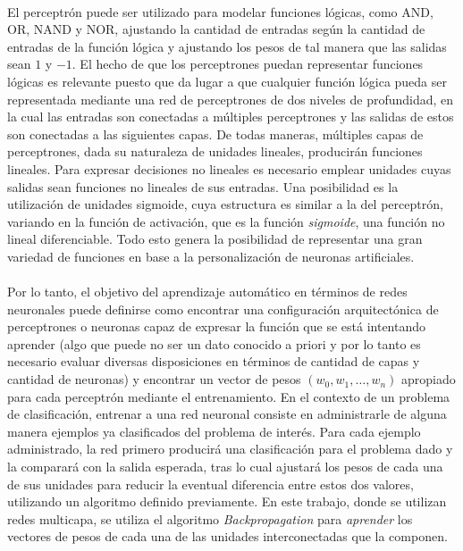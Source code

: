 \paragraph{}El perceptrón puede ser utilizado para modelar funciones lógicas, como AND, OR, NAND y NOR, ajustando la cantidad de entradas según la cantidad de entradas de la función lógica y ajustando los pesos de tal manera que las salidas sean $1$ y $-1$. El hecho de que los perceptrones puedan representar funciones lógicas es relevante puesto que da lugar a que cualquier función lógica pueda ser representada mediante una red de perceptrones de dos niveles de profundidad, en la cual las entradas son conectadas a múltiples perceptrones y las salidas de estos son conectadas a las siguientes capas. De todas maneras, múltiples capas de perceptrones, dada su naturaleza de unidades lineales, producirán funciones lineales. Para expresar decisiones no lineales es necesario emplear unidades cuyas salidas sean funciones no lineales de sus entradas. Una posibilidad es la utilización de unidades sigmoide, cuya estructura es similar a la del perceptrón, variando en la función de activación, que es la función \textit{sigmoide}, una función no lineal diferenciable. Todo esto genera la posibilidad de representar una gran variedad de funciones en base a la personalización de neuronas artificiales.

\paragraph{}Por lo tanto, el objetivo del aprendizaje automático en términos de redes neuronales puede definirse como encontrar una configuración arquitectónica de perceptrones o neuronas capaz de expresar la función que se está intentando aprender (algo que puede no ser un dato conocido a priori y por lo tanto es necesario evaluar diversas disposiciones en términos de cantidad de capas y cantidad de neuronas) y encontrar un vector de pesos $(w_0,w_1,\dots,w_n)$ apropiado para cada perceptrón mediante el entrenamiento. 
En el contexto de un problema de clasificación, entrenar a una red neuronal consiste en administrarle de alguna manera ejemplos ya clasificados del problema de interés. Para cada ejemplo administrado, la red primero producirá una clasificación para el problema dado y la comparará con la salida esperada, tras lo cual ajustará los pesos de cada una de sus unidades para reducir la eventual diferencia entre estos dos valores, utilizando un algoritmo definido previamente.
En este trabajo, donde se utilizan redes multicapa, se utiliza el algoritmo \textit{Backpropagation} para \textit{aprender} los vectores de pesos de cada una de las unidades interconectadas que la componen. 


